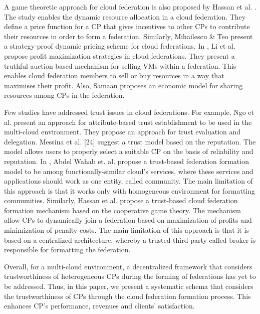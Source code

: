 \documentclass[preprint]{elsarticle}
\theoremstyle{definition}
\theoremstyle{remark}
\theoremstyle{property}
\begin{document}
A game theoretic approach for cloud federation is
also proposed by Hassan et al. \cite{hassan2011distributed}. The study enables
the dynamic resource allocation in a cloud federation. They
define a price function for a CP that gives incentives to
other CPs to contribute their resources in order to form
a federation. Similarly, Mihailescu \& Teo
\cite{mihailescu2010dynamic} present a strategy-proof dynamic pricing scheme for
cloud federations. In \cite{li2013profit}, Li et al. propose profit maximization
strategies in cloud federations. They present a
truthful auction-based mechanism for selling VMs within a federation. This enables cloud federation members to sell
or buy resources in a way that maximises their profit.
Also, Samaan \cite{samaan2014novel} proposes an economic model for
sharing resources among CPs in the federation.

Few studies have addressed trust issues in cloud federations. For example, Ngo et al. \cite{ngo2012toward} present an approach for attribute-based trust establishment to be used in the multi-cloud environment. They propose an approach for trust evaluation and delegation. Messina et al. [24] suggest a trust model based on the reputation. The model allows users to properly select a suitable CP on the basis of reliability and reputation. In \cite{wahab2016towards}, Abdel Wahab et. al. propose a trust-based federation formation model to be among functionally-similar cloud's services, where these services and applications should work as one entity, called community. The main limitation of this approach is that it works only with homogeneous environment for formatting communities. Similarly, Hassan et al. \cite{hassan2015qos} propose a trust-based cloud federation formation mechanism based on the cooperative game theory. The mechanism allow CPs to dynamically join a federation based on maximization of profits and minimization of penalty costs. The main limitation of this approach is that it is based on a centralized
architecture, whereby a trusted third-party called broker \cite{medjahed2005dynamic} is responsible for formatting the federation.

Overall, for a multi-cloud environment, a decentralized framework that considers trustworthiness of heterogeneous CPs during the forming of federations has yet to be addressed. Thus, in this paper, we present a systematic schema that considers the trustworthiness of CPs through
the cloud federation formation process. This enhances CP's performance, revenues and clients’ satisfaction.
\end{document}
